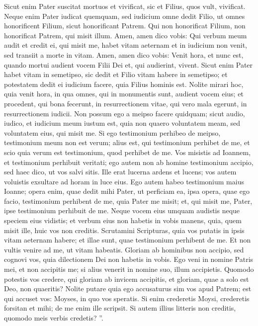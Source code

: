 \begin{biblechapter}
\begin{biblechapter}
\begin{biblechapter}
\begin{biblechapter}
\begin{biblechapter}
\verse Sicut enim Pater suscitat mortuos et vivificat, sic et Filius, quos vult, vivificat. 
\verse Neque enim Pater iudicat quemquam, sed iudicium omne dedit Filio, 
\verse ut omnes honorificent Filium, sicut honorificant Patrem. Qui non honorificat Filium, non honorificat Patrem, qui misit illum. 
\verse Amen, amen dico vobis: Qui verbum meum audit et credit ei, qui misit me, habet vitam aeternam et in iudicium non venit, sed transiit a morte in vitam. 
\verse Amen, amen dico vobis: Venit hora, et nunc est, quando mortui audient vocem Filii Dei et, qui audierint, vivent. 
\verse Sicut enim Pater habet vitam in semetipso, sic dedit et Filio vitam habere in semetipso; 
 \verse et potestatem dedit ei iudicium facere, quia Filius hominis est. 
\verse Nolite mirari hoc, quia venit hora, in qua omnes, qui in monumentis sunt, audient vocem eius; 
\verse et procedent, qui bona fecerunt, in resurrectionem vitae, qui vero mala egerunt, in resurrectionem iudicii. 
\verse Non possum ego a meipso facere quidquam; sicut audio, iudico, et iudicium meum iustum est, quia non quaero voluntatem meam, sed voluntatem eius, qui misit me.
 \verse Si ego testimonium perhibeo de meipso, testimonium meum non est verum; 
\verse alius est, qui testimonium perhibet de me, et scio quia verum est testimonium, quod perhibet de me. 
\verse Vos misistis ad Ioannem, et testimonium perhibuit veritati; 
\verse ego autem non ab homine testimonium accipio, sed haec dico, ut vos salvi sitis. 
\verse Ille erat lucerna ardens et lucens; vos autem voluistis exsultare ad horam in luce eius.
 \verse Ego autem habeo testimonium maius Ioanne; opera enim, quae dedit mihi Pater, ut perficiam ea, ipsa opera, quae ego facio, testimonium perhibent de me, quia Pater me misit; 
\verse et, qui misit me, Pater, ipse testimonium perhibuit de me. Neque vocem eius umquam audistis neque speciem eius vidistis; 
\verse et verbum eius non habetis in vobis manens, quia, quem misit ille, huic vos non creditis. 
\verse Scrutamini Scripturas, quia vos putatis in ipsis vitam aeternam habere; et illae sunt, quae testimonium perhibent de me. 
\verse Et non vultis venire ad me, ut vitam habeatis.
 \verse Gloriam ab hominibus non accipio, 
\verse sed cognovi vos, quia dilectionem Dei non habetis in vobis. 
\verse Ego veni in nomine Patris mei, et non accipitis me; si alius venerit in nomine suo, illum accipietis. 
\verse Quomodo potestis vos credere, qui gloriam ab invicem accipitis, et gloriam, quae a solo est Deo, non quaeritis? 
\verse Nolite putare quia ego accusaturus sim vos apud Patrem; est qui accuset vos: Moyses, in quo vos speratis. 
\verse Si enim crederetis Moysi, crederetis forsitan et mihi; de me enim ille scripsit. 
\verse Si autem illius litteris non creditis, quomodo meis verbis credetis? ”.
 

\end{biblechapter}
\end{biblechapter}
\end{biblechapter}
\end{biblechapter}
\end{biblechapter}

